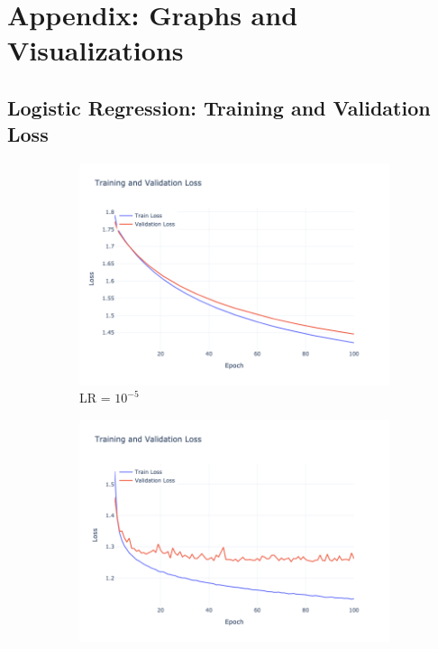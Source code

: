 \section{Appendix: Graphs and Visualizations}

\subsection{Logistic Regression: Training and Validation Loss}
\begin{figure}[htbp!]
    \centering
    \begin{subfigure}{0.32\textwidth}
        \centering
        \includegraphics[width=\textwidth]{images/logistic_regression-training-validation-loss-batch-32-lr-1e-05-epochs-100-l2-0.01-opt-sgd.png}
        \caption{LR = $10^{-5}$}
    \end{subfigure}
    \begin{subfigure}{0.32\textwidth}
        \centering
        \includegraphics[width=\textwidth]{images/logistic_regression-training-validation-loss-batch-32-lr-0.001-epochs-100-l2-0.01-opt-sgd.png}

\end{subfigure}
\end{figure}
